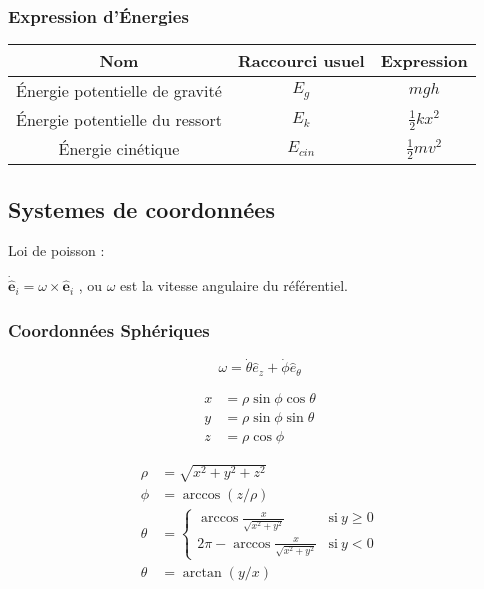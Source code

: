 \documentclass[10pt,a4paper]{article}
\begin{document}
\subsubsection{Expression d'Énergies}

\begin{tabular}{c|c|c}
Nom & Raccourci usuel & Expression \\
\hline
Énergie potentielle de gravité & $E_{g}$ & $mgh$ \\
Énergie potentielle du ressort & $E_k$ & $\frac{1}{2}kx^2$ \\
Énergie cinétique & $E_{cin}$ & $\frac{1}{2}mv^2$ \\
\end{tabular}

\pagebreak

\subsection{Systemes de coordonnées}

Loi de poisson :

\begin{center}
$\dot{\hat{\mathbf{e}}}_i = \omega \times \hat{\mathbf{e}}_i$ , ou $\omega$ est la vitesse angulaire du référentiel.
\end{center}



\subsubsection{Coordonnées Sphériques}

$$\omega = \dot\theta \hat e_z + \dot\phi \hat e_\theta$$

\begin{multicols}{3}

\begin{align*}
x & = \rho \sin \phi \cos \theta \\
y & = \rho \sin \phi \sin \theta \\
z & = \rho \cos \phi
\end{align*}

\columnbreak



\columnbreak


\begin{align*}
\rho   &= \sqrt{x^2+y^2+z^2}\\
\phi &= \arccos(z/\rho)\\
\theta &= \begin{cases}\arccos\frac{x}{\sqrt{x^2+y^2}} & \mathrm{si}\ y\geq{0} \\ 2\pi-\arccos\frac x{\sqrt{x^2+y^2}} & \mathrm{si}\ y < 0\end{cases}\\
\theta &= \arctan(y/x)
\end{align*}

\end{multicols}
\end{document}
